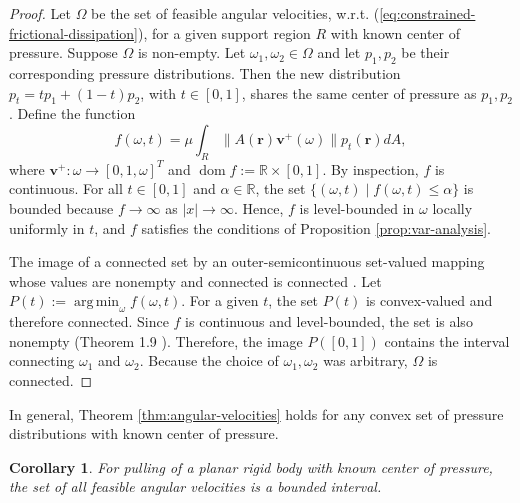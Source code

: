 \documentclass[conference]{IEEEtran}
\newtheorem{corollary}{Corollary}
\DeclareMathOperator*{\argmin}{arg\,min}
\DeclareMathOperator{\dom}{dom}
\begin{document}
\begin{proof}
  Let $\Omega$ be the set of feasible angular velocities,
  w.r.t. (\ref{eq:constrained-frictional-dissipation}), for a given
  support region $R$ with known center of pressure. Suppose $\Omega$
  is non-empty.
  Let $\omega_1, \omega_2 \in \Omega$ and let $p_1, p_2$ be their
  corresponding pressure distributions. Then the new distribution
  $p_t = tp_1 + (1-t)p_2$, with $t \in [0,1]$, shares the same center
  of pressure as $p_1,p_2$. Define the function
  \begin{equation}
    f(\omega, t) = \mu\int_R\lVert A(\mathbf{r})\mathbf{v}^+(\omega)\rVert p_t(\mathbf{r})dA,
  \end{equation}
  where $\mathbf{v}^+: \omega \rightarrow [0,1,\omega]^T$ and
  $\dom f:= \mathbb{R}\times[0,1]$. By inspection, $f$ is
  continuous. For all $t \in [0,1]$ and $\alpha \in \mathbb{R}$, the
  set $\{(\omega,t)\;|\;f(\omega,t)\leq \alpha\}$ is bounded because
  $f \rightarrow \infty$ as $|x|\rightarrow \infty$. Hence, $f$ is
  level-bounded in $\omega$ locally uniformly in $t$, and $f$
  satisfies the conditions of Proposition \ref{prop:var-analysis}.

  The image of a connected set by an outer-semicontinuous set-valued
  mapping whose values are nonempty and connected is connected
  \cite{hiriart1985images}. Let $P(t) := \argmin_\omega f(\omega,t)$.
  For a given $t$, the set $P(t)$ is convex-valued and therefore
  connected. Since $f$ is continuous and level-bounded, the set is
  also nonempty (Theorem 1.9 \cite{Rockafellar}). Therefore, the image
  $P([0,1])$ contains the interval connecting $\omega_1$ and
  $\omega_2$. Because the choice of $\omega_1,\omega_2$ was arbitrary,
  $\Omega$ is connected.
\end{proof}

In general, Theorem \ref{thm:angular-velocities} holds for any convex
set of pressure distributions with known center of pressure. 


\begin{corollary}\label{cor:bounded}
  For pulling of a planar rigid body with known center of pressure,
  the set of all feasible angular velocities is a bounded interval.
\end{corollary}
\end{document}
